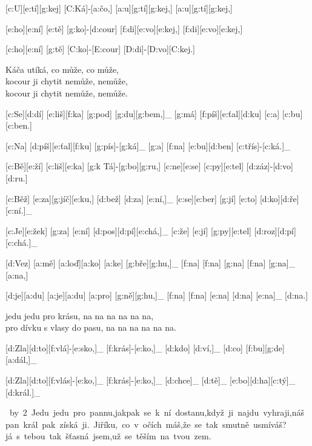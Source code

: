 [c:U][e:tí][g:kej] [C:Ká]-[a:čo,] %
[a:u][g:tí][g:kej,] [a:u][g:tí][g:kej,]

[e:ho][e:ní] [e:tě] [g:ko]-[d:cour] %
[f:di][e:vo][e:kej,] [f:di][e:vo][e:kej,]

[c:ho][e:ní] [g:tě] [C:ko]-[E:cour] [D:di]-[D:vo][C:kej.]

Káča utíká, co může, co může,\\
kocour ji chytit nemůže, nemůže,\\
kocour ji chytit nemůže, nemůže.



[c:Se][d:dí] [e:liš][f:ka] [g:pod] [g:du][g:bem,]_
[g:má] [f:píš][e:ťal][d:ku] [c:a] [c:bu][c:ben.]

[c:Na] [d:píš][e:ťal][f:ku] [g:pís]-[g:ká]_
[g:a] [f:na] [e:bu][d:ben] [c:třís]-[c:ká.]_



[c:Bě][e:ží] [c:liš][e:ka] [g:k Tá]-[g:bo][g:ru,] %
[c:ne][e:se] [c:py][e:tel] [d:záz]-[d:vo][d:ru.]

[c:Běž] [e:za][g:jíč][e:ku,] [d:bež] [d:za] [e:ní,]_
[c:se][e:ber] [g:jí] [e:to] [d:ko][d:ře][c:ní.]_

[c:Je][e:žek] [g:za] [e:ní] [d:pos][d:pí][e:chá,]_
[c:že] [e:jí] [g:py][e:tel] [d:roz][d:pí][c:chá.]_



[d:Vez] [a:mě] [a:loď][a:ko] [a:ke] [g:bře][g:hu,]_
[f:na] [f:na] [g:na] [f:na] [g:na]_ [a:na,]

[d:je][a:du] [a:je][a:du] [a:pro] [g:ně][g:hu,]_
[f:na] [f:na] [e:na] [d:na] [e:na]_ [d:na.]

jedu jedu pro krásu, na na na na na na,\\
pro dívku s vlasy do pasu, na na na na na na.

[d:Zla][d:to][f:vlá]-[e:sko,]_ [f:krás]-[e:ko,]_
[d:kdo] [d:ví,]_ [d:co] [f:bu][g:de] [a:dál,]_

[d:Zla][d:to][f:vlás]-[e:ko,]_ [f:krás]-[e:ko,]_
[d:chce]_ [d:tě]_ [e:bo][d:ha][c:tý]_ [d:král.]_

\leavevmode
\hbox{%
\divide\hsize by 2
\vbox{Jedu jedu pro pannu,\\
jakpak se k ní dostanu,\\
když ji najdu vyhraji,\\
náš pan král pak získá ji.}%
\vbox{Jiříku, co v očích máš,\\
že se tak smutně usmíváš?\\
já s tebou tak šťasná jsem,\\
už se těším na tvou zem.}}



